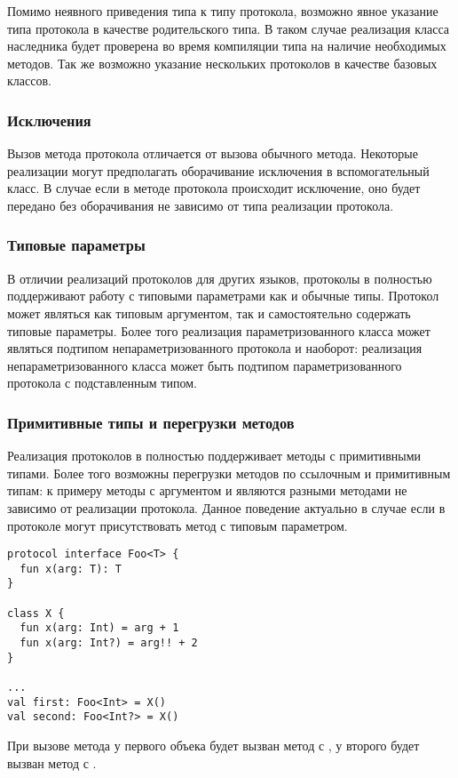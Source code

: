 Помимо неявного приведения типа к типу протокола, возможно явное указание типа протокола в качестве родительского типа. В таком случае реализация класса наследника будет проверена во время компиляции типа на наличие необходимых методов. Так же возможно указание нескольких протоколов в качестве базовых классов.

\subsubsection{Исключения}
Вызов метода протокола отличается от вызова обычного метода. Некоторые реализации могут предполагать оборачивание исключения в вспомогательный класс. В случае если в методе протокола происходит исключение, оно будет передано без оборачивания не зависимо от типа реализации протокола.

\subsubsection{Типовые параметры}
В отличии реализаций протоколов для других  языков, протоколы в  полностью поддерживают работу с типовыми параметрами как и обычные типы. Протокол может являться как типовым аргументом, так и самостоятельно содержать типовые параметры. Более того реализация параметризованного класса может являться подтипом непараметризованного протокола и наоборот: реализация непараметризованного класса может быть подтипом параметризованного протокола с подставленным типом.

\subsubsection{Примитивные типы и перегрузки методов}
Реализация протоколов в  полностью поддерживает методы с примитивными типами. Более того возможны перегрузки методов по ссылочным и примитивным типам: к примеру методы с аргументом  и  являются разными методами не зависимо от реализации протокола. Данное поведение актуально в случае если в протоколе могут присутствовать метод с типовым параметром.
\begin{verbatim}
protocol interface Foo<T> {
  fun x(arg: T): T
}

class X {
  fun x(arg: Int) = arg + 1
  fun x(arg: Int?) = arg!! + 2
}

...
val first: Foo<Int> = X()
val second: Foo<Int?> = X()
\end{verbatim}
При вызове метода у первого объека будет вызван метод с , у второго будет вызван метод с .

